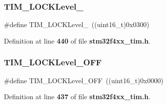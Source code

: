 \subsubsection{T\+I\+M\+\_\+\+L\+O\+C\+K\+Level\+\_}
{\footnotesize\ttfamily \#define T\+I\+M\+\_\+\+L\+O\+C\+K\+Level\+\_~((uint16\+\_\+t)0x0300)}



Definition at line \textbf{ 440} of file \textbf{ stm32f4xx\+\_\+tim.\+h}.

\mbox{\label{group__TIM__Lock__level_ga84d318c62d3e5dfe7082610d03e11f2f}} 
\subsubsection{T\+I\+M\+\_\+\+L\+O\+C\+K\+Level\+\_\+\+O\+FF}
{\footnotesize\ttfamily \#define T\+I\+M\+\_\+\+L\+O\+C\+K\+Level\+\_\+\+O\+FF~((uint16\+\_\+t)0x0000)}



Definition at line \textbf{ 437} of file \textbf{ stm32f4xx\+\_\+tim.\+h}.

